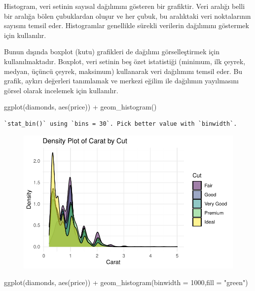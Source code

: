 \documentclass[
  letterpaper,
  DIV=11,
  numbers=noendperiod]{scrreprt}
\newenvironment{Shaded}{\begin{snugshade}}{\end{snugshade}}
\newcommand{\AttributeTok}[1]{\textcolor[rgb]{0.40,0.45,0.13}{#1}}
\newcommand{\DecValTok}[1]{\textcolor[rgb]{0.68,0.00,0.00}{#1}}
\newcommand{\FunctionTok}[1]{\textcolor[rgb]{0.28,0.35,0.67}{#1}}
\newcommand{\NormalTok}[1]{\textcolor[rgb]{0.00,0.23,0.31}{#1}}
\newcommand{\SpecialCharTok}[1]{\textcolor[rgb]{0.37,0.37,0.37}{#1}}
\newcommand{\StringTok}[1]{\textcolor[rgb]{0.13,0.47,0.30}{#1}}
\begin{document}
Histogram, veri setinin sayısal dağılımını gösteren bir grafiktir. Veri
aralığı belli bir aralığa bölen çubuklardan oluşur ve her çubuk, bu
aralıktaki veri noktalarının sayısını temsil eder. Histogramlar
genellikle sürekli verilerin dağılımını göstermek için kullanılır.

Bunun dışında boxplot (kutu) grafikleri de dağılımı görselleştirmek için
kullanılmaktadır. Boxplot, veri setinin beş özet istatistiği (minimum,
ilk çeyrek, medyan, üçüncü çeyrek, maksimum) kullanarak veri dağılımını
temsil eder. Bu grafik, aykırı değerleri tanımlamak ve merkezi eğilim
ile dağılımın yayılmasını görsel olarak incelemek için kullanılır.

\begin{Shaded}
\begin{Highlighting}[]
\FunctionTok{ggplot}\NormalTok{(diamonds, }\FunctionTok{aes}\NormalTok{(price)) }\SpecialCharTok{+}
  \FunctionTok{geom\_histogram}\NormalTok{()}
\end{Highlighting}
\end{Shaded}

\begin{verbatim}
`stat_bin()` using `bins = 30`. Pick better value with `binwidth`.
\end{verbatim}

\begin{figure}[H]

{\centering \includegraphics{ggplot2_files/figure-pdf/unnamed-chunk-4-1.pdf}

}

\end{figure}

\begin{Shaded}
\begin{Highlighting}[]
\FunctionTok{ggplot}\NormalTok{(diamonds, }\FunctionTok{aes}\NormalTok{(price)) }\SpecialCharTok{+}
  \FunctionTok{geom\_histogram}\NormalTok{(}\AttributeTok{binwidth =} \DecValTok{1000}\NormalTok{,}\AttributeTok{fill =} \StringTok{"green"}\NormalTok{)}
\end{Highlighting}
\end{Shaded}
\end{document}
